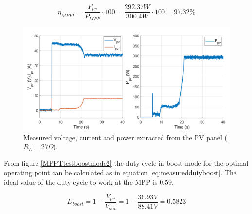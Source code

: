 \begin{equation} \label{eq:effMPPTboost}
\eta_{MPPT}= \dfrac{P_{pv}}{P_{MPP}} \cdot 100 = \dfrac{292.37W}{300.4W} \cdot 100 = 97.32\%  
\end{equation}


\begin{figure}[H]
	\begin{center}
		\includegraphics[width=1\textwidth]{../Pictures/P1/Test/Boost_mode_MPPT_Vin_Iin_Pin}
		\caption{Measured voltage, current and power extracted from the PV panel ($R_{L}=27\Omega$).}
		\label{MPPTtestboostmode1}
	\end{center}	
\end{figure}



From figure \ref{MPPTtestboostmode2} the duty cycle in boost mode for the optimal operating point can be calculated as in equation \ref{eq:measureddutyboost}. The ideal value of the duty cycle to work at the MPP is 0.59.

\begin{equation} \label{eq:measureddutyboost}
D_{boost}= 1 - \dfrac{V_{pv}}{V_{out}} = 1 - \dfrac{36.93V}{88.41V} = 0.5823
\end{equation}


